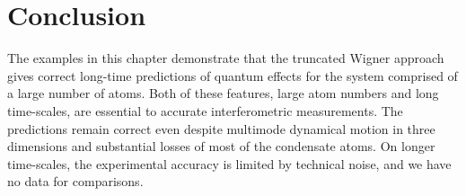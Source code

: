 \section{Conclusion}

The examples in this chapter demonstrate that the truncated Wigner approach gives correct long-time predictions of quantum effects for the system comprised of a large number of atoms.
Both of these features, large atom numbers and long time-scales, are essential to accurate interferometric measurements.
The predictions remain correct even despite multimode dynamical motion in three dimensions and substantial losses of most of the condensate atoms.
On longer time-scales, the experimental accuracy is limited by technical noise, and we have no data for comparisons.
